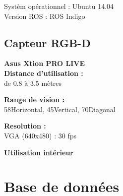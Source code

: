 Systèm opérationnel : Ubuntu 14.04 \\
Version ROS : ROS Indigo \\

\subsection{Capteur RGB-D}

{
  \raggedleft
}

\textbf{Asus Xtion PRO LIVE} \\
\textbf{Distance d'utilisation : }\\
de 0.8 à 3.5 mètres

\textbf{Range de vision : } \\
58\degree Horizontal, 45\degree Vertical, 70\degree Diagonal

\textbf{Resolution : } \\
VGA (640x480) : 30 fps

\textbf{Utilisation intérieur}


\section{Base de données }

\begin{figure}[H]
\end{figure}

\begin{figure}[H]
\end{figure}

